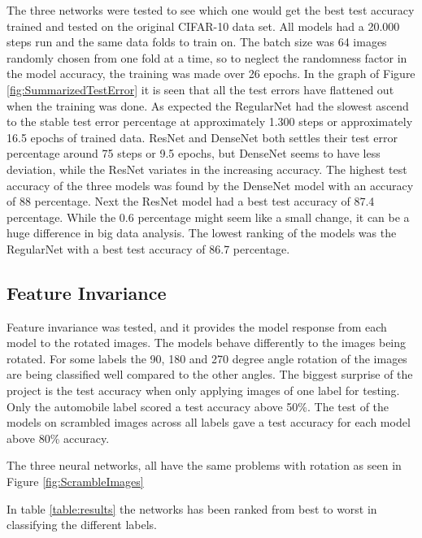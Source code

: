 The three networks were tested to see which one would get the best test accuracy trained and tested on the original CIFAR-10 data set. All models had a 20.000 steps run and the same data folds to train on. The batch size was 64 images randomly chosen from one fold at a time, so to neglect the randomness factor in the model accuracy, the training was made over 26 epochs. In the graph of Figure \ref{fig:SummarizedTestError} it is seen that all the test errors have flattened out when the training was done. As expected the RegularNet had the slowest ascend to the stable test error percentage at approximately 1.300 steps or approximately 16.5 epochs of trained data. ResNet and DenseNet both settles their test error percentage around 75 steps or 9.5 epochs, but DenseNet seems to have less deviation, while the ResNet variates in the increasing accuracy. The highest test accuracy of the three models was found by the DenseNet model with an accuracy of 88 percentage. Next the ResNet model had a best test accuracy of 87.4 percentage. While the 0.6 percentage might seem like a small change, it can be a huge difference in big data analysis. The lowest ranking of the models was the RegularNet with a best test accuracy of 86.7 percentage.

\subsection{Feature Invariance}

Feature invariance was tested, and it provides the model response from each model to the rotated images. The models behave differently to the images being rotated. For some labels the 90, 180 and 270 degree angle rotation of the images are being classified well compared to the other angles. The biggest surprise of the project is the test accuracy when only applying images of one label for testing. Only the automobile label scored a test accuracy above 50\%. The test of the models on scrambled images across all labels gave a test accuracy for each model above 80\% accuracy.

The three neural networks, all have the same problems with rotation as seen in Figure \ref{fig:ScrambleImages} 

\FloatBarrier

In table \ref{table:results} the networks has been ranked from best to worst in classifying the different labels. 

